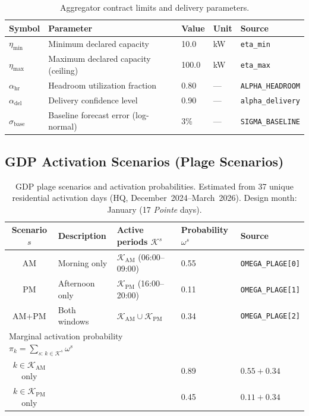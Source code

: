 \begin{table}[htbp]
\centering
\caption{Aggregator contract limits and delivery parameters.}
\label{tab:aggregator}
\begin{tabular}{lllll}
\toprule
Symbol & Parameter & Value & Unit & Source \\
\midrule
$\eta_\text{min}$      & Minimum declared capacity            & 10.0 & kW & \texttt{eta\_min} \\
$\eta_\text{max}$      & Maximum declared capacity (ceiling)  & 100.0 & kW & \texttt{eta\_max} \\
$\alpha_\text{hr}$     & Headroom utilization fraction        & 0.80 & — & \texttt{ALPHA\_HEADROOM} \\
$\alpha_\text{del}$    & Delivery confidence level            & 0.90 & — & \texttt{alpha\_delivery} \\
$\sigma_\text{base}$   & Baseline forecast error (log-normal) & 3\%  & — & \texttt{SIGMA\_BASELINE} \\
\bottomrule
\end{tabular}
\end{table}

\subsection*{GDP Activation Scenarios (Plage Scenarios)}

\begin{table}[htbp]
\centering
\caption{GDP plage scenarios and activation probabilities.
Estimated from 37 unique residential activation days (HQ, December~2024–March~2026).
Design month: January (17 \emph{Pointe} days).}
\label{tab:plage}
\begin{tabular}{cllll}
\toprule
Scenario $s$ & Description & Active periods $\mathcal{K}^s$ & Probability $\omega^s$ & Source \\
\midrule
AM      & Morning only       & $\mathcal{K}_\text{AM}$ (06:00–09:00)                     & 0.55 & \texttt{OMEGA\_PLAGE[0]} \\
PM      & Afternoon only     & $\mathcal{K}_\text{PM}$ (16:00–20:00)                     & 0.11 & \texttt{OMEGA\_PLAGE[1]} \\
AM+PM   & Both windows       & $\mathcal{K}_\text{AM} \cup \mathcal{K}_\text{PM}$        & 0.34 & \texttt{OMEGA\_PLAGE[2]} \\
\midrule
\multicolumn{3}{l}{Marginal activation probability $\pi_k = \sum_{s:\,k\in\mathcal{K}^s} \omega^s$} & & \\
\quad $k \in \mathcal{K}_\text{AM}$ only & & & 0.89 & $0.55+0.34$ \\
\quad $k \in \mathcal{K}_\text{PM}$ only & & & 0.45 & $0.11+0.34$ \\
\bottomrule
\end{tabular}
\end{table}

